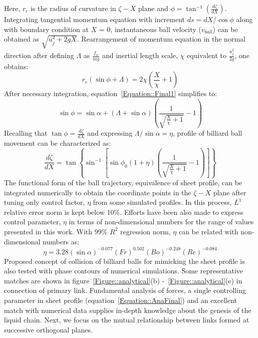 \documentclass{jfm}
\begin{document}
Here, $r_c$ is the radius of curvature in $\zeta-X$ plane and $\phi = \tan^{-1}\left(\frac{d\zeta}{dX}\right)$. Integrating tangential momentum equation with increment $ds = dX/\cos\phi$ along with boundary condition at $X$ = 0, instantaneous ball velocity ($v_{ball}$) can be obtained as $\sqrt{u_j^2 + 2gX}$. Rearrangement of momentum equation in the normal direction after defining $\Lambda$ as $\frac{f_n}{mg}$ and inertial length scale, $\chi$ equivalent to $\frac{u_j^2}{2g}$, one obtains:
\begin{equation}\label{Equation::Final1}
r_c\left(\sin\phi + \Lambda\right) = 2\chi\left(\frac{X}{\chi} + 1\right)
\end{equation} 
After necessary integration, equation~\ref{Equation::Final1} simplifies to:
\begin{equation}
\sin\phi  = \sin\alpha + \left(\Lambda + \sin\alpha\right)\left(\frac{1}{\sqrt{\frac{X}{\chi} + 1}} - 1\right)	
\end{equation}
Recalling that $\tan\phi = \frac{d\zeta}{dX}$ and expressing $\Lambda/\sin\alpha = \eta$, profile of billiard ball movement can be characterized as:
\begin{equation}
\label{Equation::AnaFinal}
\frac{d\zeta}{dX} = \tan\left\lbrace\sin^{-1}\left[ \sin\phi_0\left(1 + \eta\right)\left(\frac{1}{\sqrt{\frac{X}{\chi} + 1}} - 1\right) \right]\right\rbrace
\end{equation}
The functional form of the ball trajectory, equivalence of sheet profile, can be integrated numerically to obtain the coordinate points in the $\zeta-X$ plane after tuning only control factor, $\eta$ from some simulated profiles. In this process, $L^1$ relative error norm is kept below 10\%. Efforts have been also made to express control parameter, $\eta$ in terms of non-dimensional numbers for the range of values presented in this work. With 99\% $R^2$ regression norm, $\eta$ can be related with non-dimensional numbers as:
\begin{equation}\label{Equation::eta}
\eta = 3.28(\sin\alpha)^{-0.077}(Fr)^{0.502}(Bo)^{-0.248}\left(Re\right)^{-0.084}
\end{equation}
Proposed concept of collision of billiard balls for mimicking the sheet profile is also tested with phase contours of numerical simulations. Some representative matches are shown in figure~\ref{Figure::analytical}(b) -~\ref{Figure::analytical}(e) in connection of primary link. Fundamental analysis of forces, a single controlling parameter in sheet profile (equation~\ref{Equation::AnaFinal}) and an excellent match with numerical data supplies in-depth knowledge about the genesis of the liquid chain. Next, we focus on the mutual relationship between links formed at successive orthogonal planes. 
\end{document}
